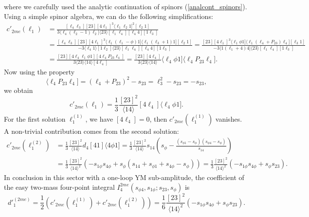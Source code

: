 where we carefully used the analytic continuation of spinors (\ref{analcont_spinors}).\\
Using a simple spinor algebra, we can do the following simplifications:
\begin{align*}
	c'_{2me}(\ell_1)&=\frac{[\ell_4\ell_3][23][4\ell_1]^3\langle \ell_1 \ell_2 1]^2[\ell_2 1]}{3\langle \ell_4 (\ell_2-1)\ell_2] \langle 23 \rangle[\ell_1\ell_4][\ell_4 4][1\ell_3]}\\
	&=\frac{[\ell_4\ell_3][23][4\ell_1]^3\langle \ell_1 (\ell_1-\phi) 1]\langle \ell_1(\ell_3+1)1][\ell_2 1]}{-3\langle \ell_4 1\rangle[1\ell_2] \langle 23 \rangle[\ell_1\ell_4][\ell_4 4][1\ell_3]}
	=\frac{[23][4\ell_1]^3\langle \ell_1\phi1]\langle \ell_1 (\ell_4+P_{23})\ell_4][\ell_3 1]}{-3\langle 1(\ell_1+4)4]\langle 23 \rangle[\ell_1\ell_4][1 \ell_3]}\\
	&=\frac{[23][4\ell_4\ell_1\phi1][4\ell_4 P_{23}\ell_4]}{3\langle 23 \rangle \langle 1 4 \rangle [4\ell_4]}=\frac{[23][4\ell_4]}{3\langle 23 \rangle \langle 14 \rangle}\langle \ell_4\phi1]\langle \ell_4 P_{23}\ell_4].
\end{align*}
Now using the property
$$
	\langle \ell_4 P_{23} \ell_4]=(\ell_4+P_{23})^2-s_{23}=\ell_3^2-s_{23}=-s_{23},
$$
we obtain
$$
	c'_{2me}(\ell_1)=\frac{1}{3}\frac{[23]^2}{\langle 14 \rangle}[4\ell_4]\langle \ell_4 \phi 1].
$$
For the first solution $\ell_1^{(1)}$, we have $[4\ell_4]=0$, then $c'_{2me}(\ell_1^{(1)})$ vanishes. A non-trivial contribution comes from the second solution:
\begin{align*}
	c'_{2me}(\ell_1^{(2)})&=\frac{1}{3}\frac{[23]^2}{\langle 14 \rangle}d_4 [41]\langle 4\phi 1]=\frac{1}{3}\frac{[23]^2}{\langle 14 \rangle} s_{14}\left(s_\phi-\frac{(s_{\phi1}-s_{\phi})(s_{\phi4}-s_\phi)}{s_{14}}\right)\\
	&=\frac{1}{3}\frac{[23]^2}{\langle 14 \rangle^2}\left(-s_{1\phi}s_{4\phi}+s_\phi (s_{14}+s_{\phi1}+s_{4\phi}-s_\phi)\right)=\frac{1}{3}\frac{[23]^2}{\langle 14 \rangle^2}(-s_{1\phi}s_{4\phi}+s_\phi s_{23}).
\end{align*}
In conclusion in this sector with a one-loop YM sub-amplitude, the coefficient of the easy two-mass four-point integral $I_4^{2me}(s_{\phi4},s_{1\phi};s_{23},s_\phi)$ is
\begin{equation}
d'^{(2me)}_1=\frac{1}{2}\left(c'_{2me}(\ell_1^{(1)})+c'_{2me}(\ell_1^{(2)})\right)=\frac{1}{6}\frac{[23]^2}{\langle 1 4 \rangle^2}(-s_{1\phi}s_{4\phi}+s_\phi s_{23}).
\end{equation}
